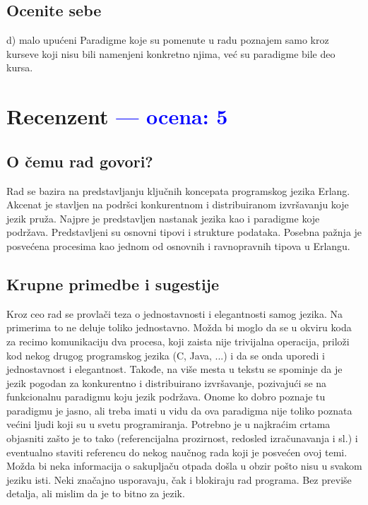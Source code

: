 \documentclass[a4paper]{report}
\newcommand{\odgovor}[1]{\textcolor{blue}{#1}}
\begin{document}
\section{Ocenite sebe}
d) malo upućeni 
Paradigme koje su pomenute u radu poznajem samo kroz kurseve koji nisu bili namenjeni konkretno njima, već su paradigme bile deo kursa.

\chapter{Recenzent \odgovor{--- ocena: 5} }


\section{O čemu rad govori?}
Rad se bazira na predstavljanju ključnih koncepata programskog jezika Erlang. Akcenat je stavljen na podršci konkurentnom i distribuiranom izvršavanju koje jezik pruža. Najpre je predstavljen nastanak jezika kao i paradigme koje podržava. Predstavljeni su osnovni tipovi i strukture podataka. Posebna pažnja je posvećena procesima kao jednom od osnovnih i ravnopravnih tipova u Erlangu.    

\section{Krupne primedbe i sugestije}
Kroz ceo rad se provlači teza o jednostavnosti i elegantnosti samog jezika. Na primerima to ne deluje toliko jednostavno. Možda bi moglo da se u okviru koda za recimo komunikaciju dva procesa, koji zaista nije trivijalna operacija, priloži kod nekog drugog programskog jezika (C, Java, ...) i da se onda uporedi i jednostavnost i elegantnost.
Takođe, na više mesta u tekstu se spominje da je jezik pogodan za konkurentno i distribuirano izvršavanje, pozivajući se na funkcionalnu paradigmu koju jezik podržava. Onome ko dobro poznaje tu paradigmu je jasno, ali treba imati u vidu da ova paradigma nije toliko poznata većini ljudi koji su u svetu programiranja. Potrebno je u najkraćim crtama objasniti zašto je to tako (referencijalna prozirnost, redosled izračunavanja i sl.) i eventualno staviti referencu do nekog naučnog rada koji je posvećen ovoj temi. Možda bi neka informacija o sakupljaču otpada došla u obzir pošto nisu u svakom jeziku isti. Neki značajno usporavaju, čak i blokiraju rad programa. Bez previše detalja, ali mislim da je to bitno za jezik.\\
\end{document}
